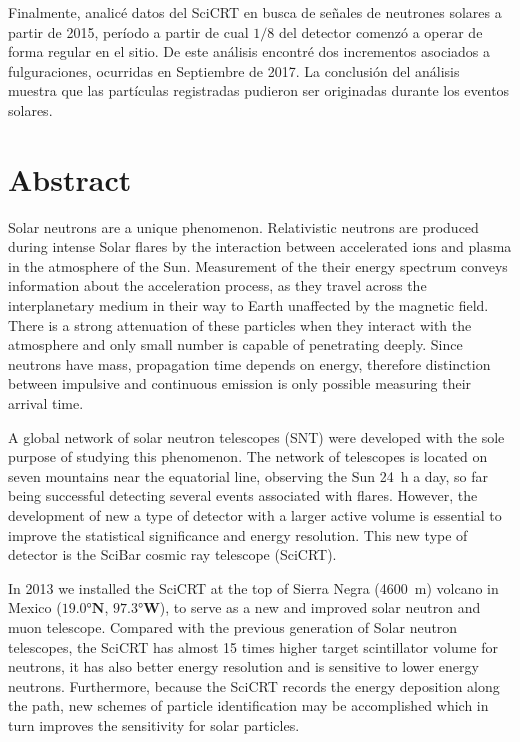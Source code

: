 Finalmente, analicé datos del SciCRT en busca de señales de neutrones solares a partir de \num{2015}, período a partir de cual $1/8$ del detector comenzó a operar de forma regular en el sitio. De este análisis encontré dos incrementos asociados a fulguraciones, ocurridas en Septiembre de \num{2017}. La conclusión del análisis muestra que las partículas registradas pudieron ser originadas durante los eventos solares.

\chapter{Abstract}

Solar neutrons are a unique phenomenon. Relativistic neutrons are produced during intense Solar flares by the interaction between accelerated ions and plasma in the atmosphere of the Sun. Measurement of the their energy spectrum conveys information about the acceleration process, as they travel across the interplanetary medium in their way to Earth unaffected by the magnetic field. There is a strong attenuation of these particles when they interact with the atmosphere and only small number is capable of penetrating deeply. Since neutrons have mass, propagation time depends on energy, therefore distinction between impulsive and continuous emission is only possible measuring their arrival time.

A global network of solar neutron telescopes (SNT) were developed with the sole purpose of studying this phenomenon. The network of telescopes is located on seven mountains near the equatorial line, observing the Sun \SI{24}{\hour} a day, so far being successful detecting several events associated with flares. However, the development of new a type of detector with a larger active volume is essential to improve the statistical significance and energy resolution. This new type of detector is the SciBar cosmic ray telescope  (SciCRT).

In \num{2013} we installed the SciCRT at the top of Sierra Negra (\SI{4600}{\metre}) volcano in Mexico ($\ang{19.0}\mathbf{N}$, $\ang{97.3}\mathbf{W}$), to serve as a new and improved solar neutron and muon telescope. Compared with the previous generation of Solar neutron telescopes, the SciCRT has almost \num{15} times higher target scintillator volume for neutrons, it has also better energy resolution and is sensitive to lower energy neutrons. Furthermore, because the SciCRT records the energy deposition along the path, new schemes of particle identification may be accomplished which in turn improves the sensitivity for solar particles.

